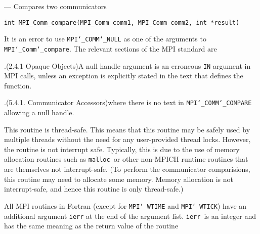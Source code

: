 \startmanpage
{}
--- Compares two communicators 
\startvb\begin{verbatim}
int MPI_Comm_compare(MPI_Comm comm1, MPI_Comm comm2, int *result)

\end{verbatim}
\endvb

\par
{}
\par
{}
\par
It is an error to use {\tt MPI{\tt \char`\_}COMM{\tt \char`\_}NULL} as one of the arguments to
{\tt MPI{\tt \char`\_}Comm{\tt \char`\_}compare}.  The relevant sections of the MPI standard are
\par
.(2.4.1 Opaque Objects)A null handle argument is an erroneous {\tt IN} argument in MPI calls, unless an
exception is explicitly stated in the text that defines the function.
\par
.(5.4.1. Communicator Accessors)where there is no text in {\tt MPI{\tt \char`\_}COMM{\tt \char`\_}COMPARE} allowing a null handle.
\par
{}
\par
This routine is thread-safe.  This means that this routine may be
safely used by multiple threads without the need for any user-provided
thread locks.  However, the routine is not interrupt safe.  Typically,
this is due to the use of memory allocation routines such as {\tt malloc
}or other non-MPICH runtime routines that are themselves not interrupt-safe.
(To perform the communicator comparisions, this routine may need to
allocate some memory.  Memory allocation is not interrupt-safe, and hence
this routine is only thread-safe.)
\par
{}
All MPI routines in Fortran (except for {\tt MPI{\tt \char`\_}WTIME} and {\tt MPI{\tt \char`\_}WTICK}) have
an additional argument {\tt ierr} at the end of the argument list.  {\tt ierr
}is an integer and has the same meaning as the return value of the routine
